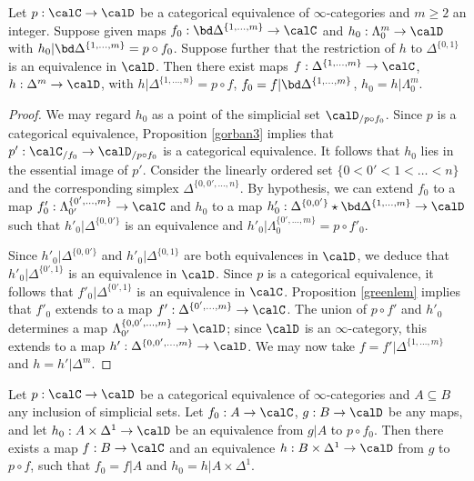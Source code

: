 \begin{lemma}\label{gorban2}
Let $p: \calC \rightarrow \calD$ be a categorical equivalence of $\infty$-categories and $m \geq 2$ an integer. Suppose given maps $f_0: \bd \Delta^{ \{1, \ldots, m\} } \rightarrow \calC$ and $h_0: \Lambda^m_0 \rightarrow \calD$ with
$h_0 | \bd \Delta^{ \{1, \ldots, m\} } = p \circ f_0$. Suppose further that the restriction of $h$ to $\Delta^{ \{0,1\} }$ is an equivalence in $\calD$. Then there exist maps $f: \Delta^{ \{1, \ldots, m\} } \rightarrow \calC$, $h: \Delta^{m} \rightarrow \calD$, with $h| \Delta^{ \{1, \ldots, n\} }= p \circ f$, $f_0 = f| \bd \Delta^{ \{1, \ldots, m\} }$, $h_0 = h| \Lambda^m_0$.
\end{lemma}

\begin{proof}
We may regard $h_0$ as a point of the simplicial set $\calD_{/ p \circ f_0}$. Since $p$ is a categorical equivalence, Proposition \ref{gorban3} implies that $p': \calC_{/f_0} \rightarrow \calD_{/p \circ f_0}$ is a categorical equivalence. It follows that $h_0$ lies in the essential image of $p'$. Consider the linearly ordered set
$\{ 0 < 0' < 1 < \ldots < n\}$ and the corresponding simplex $\Delta^{ \{0, 0', \ldots, n\} }$. By hypothesis, we can extend
$f_0$ to a map $f'_0: \Lambda^{ \{ 0', \ldots, m \} }_{0'} \rightarrow \calC$ and $h_0$ to a map $h'_0: \Delta^{ \{0,0'\} } \star \bd \Delta^{ \{1, \ldots, m \} } \rightarrow \calD$ such that $h'_0| \Delta^{ \{0,0'\} }$ is an equivalence
and $h'_0| \Lambda^{ \{0', \ldots, m\} }_0 = p \circ f'_0$. 

Since $h'_0| \Delta^{ \{0,0'\} }$ and $h'_0| \Delta^{ \{0,1\} }$ are both equivalences in $\calD$, we deduce that $h'_0| \Delta^{ \{0',1\} }$ is an equivalence in $\calD$. Since $p$ is a categorical equivalence, it follows that
$f'_0| \Delta^{ \{0',1\} }$ is an equivalence in $\calC$. Proposition \ref{greenlem} implies that $f'_0$ extends to a map $f': \Delta^{ \{0', \ldots, m\} } \rightarrow \calC$. The union of $p \circ f'$ and $h'_0$ determines a map
$\Lambda^{ \{0, 0', \ldots, m \} }_{0'} \rightarrow \calD$; since $\calD$ is an $\infty$-category, this extends to a map
$h': \Delta^{ \{0,0', \ldots, m\} } \rightarrow \calD$. We may now take $f = f' | \Delta^{ \{1, \ldots, m \} }$ and
$h = h' | \Delta^{m}$.
\end{proof}

\begin{lemma}\label{gorban}
Let $p: \calC \rightarrow \calD$ be a categorical equivalence of $\infty$-categories and $A \subseteq B$ any inclusion of simplicial sets. Let $f_0: A \rightarrow \calC$, $g: B \rightarrow \calD$ be any maps, and let $h_0: A \times \Delta^1 \rightarrow \calD$ be an equivalence from $g|A$  to $p \circ f_0$. Then there exists a map $f: B \rightarrow \calC$ and an equivalence $h: B \times \Delta^1 \rightarrow \calD$ from $g$ to $p \circ f$, such that
$f_0 = f|A$ and $h_0 = h| A \times \Delta^1$.
\end{lemma}

